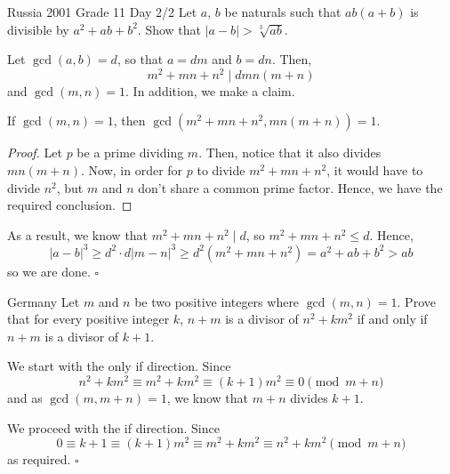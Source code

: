 \documentclass{article}
\begin{document}
\begin{problem}[1.12.8]{Russia 2001 Grade 11 Day 2/2}
Let $a$, $b$ be naturals such that $ab(a+b)$ is divisible by $a^2 + ab + b^2$. Show that $|a - b| > \sqrt[3]{ab}$.
\end{problem}
Let $\gcd(a, b) = d$, so that $a = dm$ and $b = dn$. Then, \[m^2+mn+n^2 \mid dmn(m+n)\] and $\gcd(m, n) = 1$. In addition, we make a claim.
\begin{claim*}
If $\gcd(m, n) = 1$, then $\gcd(m^2+mn+n^2, mn(m+n)) = 1$.
\end{claim*}
\begin{proof}
Let $p$ be a prime dividing $m$. Then, notice that it also divides $mn(m+n)$. Now, in order for $p$ to divide $m^2+mn+n^2$, it would have to divide $n^2$, but $m$ and $n$ don't share a common prime factor. Hence, we have the required conclusion.
\end{proof}
As a result, we know that $m^2+mn+n^2 \mid d$, so $m^2+mn+n^2 \le d$. Hence, \[|a-b|^3 \ge d^2\cdot d|m-n|^3 \ge d^2(m^2+mn+n^2) = a^2+ab+b^2 > ab\] so we are done. $\square$

\begin{problem}[1.12.9]{Germany}
Let $m$ and $n$ be two positive integers where $\gcd(m, n) = 1$. Prove that for every positive integer $k$, $n + m$ is a divisor of $n^2 + km^2$ if and only if $n + m$ is a divisor of $k + 1$.
\end{problem}
We start with the only if direction. Since \[n^2+km^2 \equiv m^2+km^2 \equiv (k+1)m^2 \equiv 0 \pmod{m+n}\] and as $\gcd(m, m+n) = 1$, we know that $m+n$ divides $k+1$.

We proceed with the if direction. Since \[0 \equiv k+1 \equiv (k+1)m^2 \equiv m^2+km^2 \equiv n^2+km^2 \pmod{m+n}\] as required. $\square$
\end{document}
